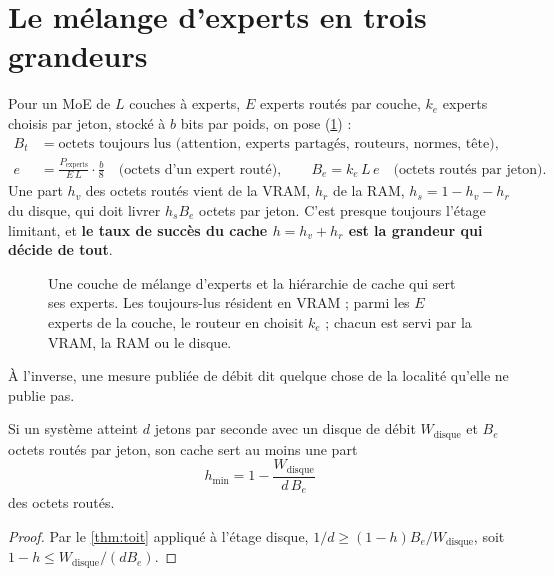 \section{Le mélange d'experts en trois grandeurs}\label{sec:moe-grandeurs}

Pour un MoE de $L$ couches à experts, $E$ experts routés par couche, $k_e$ experts choisis par jeton, stocké à $b$ bits par poids, on pose (\cref{fig:moe}) :
\begin{align}
B_t &= \text{octets toujours lus (attention, experts partagés, routeurs, normes, tête)}, \nonumber\\
e &= \frac{P_{\text{experts}}}{E\, L} \cdot \frac{b}{8} \quad \text{(octets d'un expert routé)}, \qquad
B_e = k_e\, L\, e \quad \text{(octets routés par jeton)}. \label{eq:moe-grandeurs}
\end{align}
Une part $h_v$ des octets routés vient de la VRAM, $h_r$ de la RAM, $h_s = 1 - h_v - h_r$ du disque, qui doit livrer $h_s B_e$ octets par jeton. C'est presque toujours l'étage limitant, et \textbf{le taux de succès du cache $h = h_v + h_r$ est la grandeur qui décide de tout}.

\begin{figure}[ht]
\centering
\SchemaMoE
\caption[Une couche de mélange d'experts et sa hiérarchie de cache]{Une couche de mélange d'experts et la hiérarchie de cache qui sert ses experts. Les toujours-lus résident en VRAM ; parmi les $E$ experts de la couche, le routeur en choisit $k_e$ ; chacun est servi par la VRAM, la RAM ou le disque.}
\label{fig:moe}
\end{figure}

À l'inverse, une mesure publiée de débit dit quelque chose de la localité qu'elle ne publie pas.

\begin{lemme}\label{lem:succes-implique}
Si un système atteint $d$ jetons par seconde avec un disque de débit $W_{\mathrm{disque}}$ et $B_e$ octets routés par jeton, son cache sert au moins une part
\begin{equation}\label{eq:succes-implique}
h_{\min} = 1 - \frac{W_{\mathrm{disque}}}{d\, B_e}
\end{equation}
des octets routés.
\end{lemme}

\begin{proof}
Par le \cref{thm:toit} appliqué à l'étage disque, $1/d \ge (1-h) B_e / W_{\mathrm{disque}}$, soit $1 - h \le W_{\mathrm{disque}}/(d B_e)$.
\end{proof}

